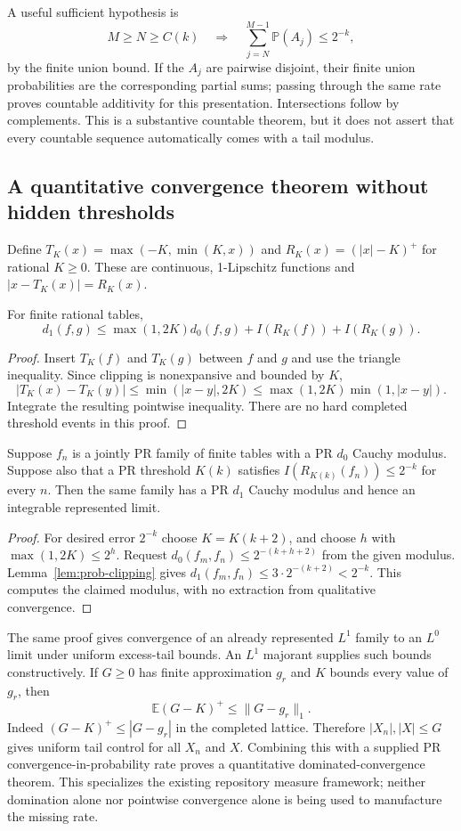 A useful sufficient hypothesis is
\[
 M\ge N\ge C(k)\quad\Longrightarrow\quad
 \sum_{j=N}^{M-1}\mathbb P(A_j)\le2^{-k},
\]
by the finite union bound. If the $A_j$ are pairwise disjoint, their finite
union probabilities are the corresponding partial sums; passing through the
same rate proves countable additivity for this presentation. Intersections
follow by complements. This is a substantive countable theorem, but it does
not assert that every countable sequence automatically comes with a tail
modulus.

\subsection{A quantitative convergence theorem without hidden thresholds}

Define $T_K(x)=\max(-K,\min(K,x))$ and
$R_K(x)=(|x|-K)^+$ for rational $K\ge0$. These are continuous, 1-Lipschitz
functions and $|x-T_K(x)|=R_K(x)$.

\begin{lemma}\label{lem:prob-clipping}
For finite rational tables,
\[
 d_1(f,g)\le\max(1,2K)d_0(f,g)+I(R_K(f))+I(R_K(g)).
\]
\end{lemma}
\begin{proof}
Insert $T_K(f)$ and $T_K(g)$ between $f$ and $g$ and use the triangle
inequality. Since clipping is nonexpansive and bounded by $K$,
\[
 |T_K(x)-T_K(y)|\le\min(|x-y|,2K)
                    \le\max(1,2K)\min(1,|x-y|).
\]
Integrate the resulting pointwise inequality. There are no hard completed
threshold events in this proof.
\end{proof}

\begin{theorem}
Suppose $f_n$ is a jointly PR family of finite tables with a PR $d_0$ Cauchy
modulus. Suppose also that a PR threshold $K(k)$ satisfies
$I(R_{K(k)}(f_n))\le2^{-k}$ for every $n$. Then the same family has a PR
$d_1$ Cauchy modulus and hence an integrable represented limit.
\end{theorem}
\begin{proof}
For desired error $2^{-k}$ choose $K=K(k+2)$, and choose $h$ with
$\max(1,2K)\le2^h$. Request $d_0(f_m,f_n)\le2^{-(k+h+2)}$ from the
given modulus. Lemma~\ref{lem:prob-clipping} gives
$d_1(f_m,f_n)\le3\cdot2^{-(k+2)}<2^{-k}$. This computes the claimed
modulus, with no extraction from qualitative convergence.
\end{proof}

The same proof gives convergence of an already represented $L^1$ family to
an $L^0$ limit under uniform excess-tail bounds. An $L^1$ majorant supplies
such bounds constructively. If $G\ge0$ has finite approximation $g_r$ and
$K$ bounds every value of $g_r$, then
\[
 \mathbb E(G-K)^+\le\|G-g_r\|_1.
\]
Indeed $(G-K)^+\le|G-g_r|$ in the completed lattice. Therefore
$|X_n|,|X|\le G$ gives uniform tail control for all $X_n$ and $X$.
Combining this with a supplied PR convergence-in-probability rate proves a
quantitative dominated-convergence theorem. This specializes the existing
repository measure framework; neither domination alone nor pointwise
convergence alone is being used to manufacture the missing rate.

